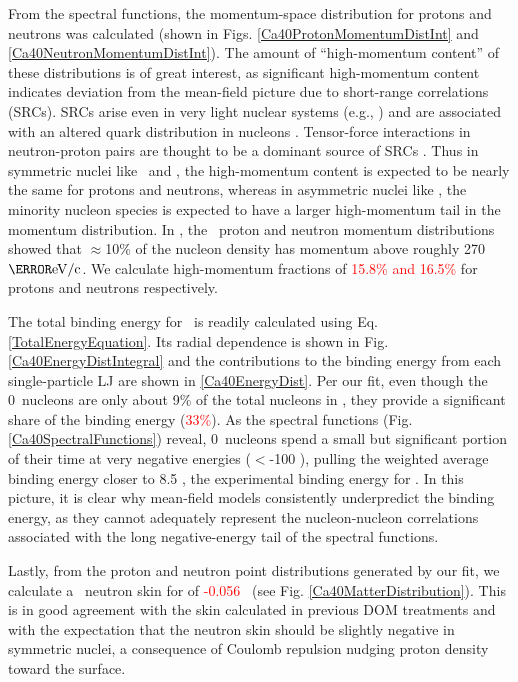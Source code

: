 From the spectral functions, the momentum-space distribution for protons and neutrons was
calculated (shown in Figs. \ref{Ca40ProtonMomentumDistInt} and
\ref{Ca40NeutronMomentumDistInt}). 
The amount of ``high-momentum content'' of
these distributions is of great interest, as significant high-momentum content 
indicates deviation from the mean-field picture due to short-range correlations (SRCs). SRCs arise 
even in very light nuclear systems (e.g., \heFour)
and are associated with an altered quark distribution in nucleons 
\cite{Hen2012, Arrington2012, CLAS2019}.
Tensor-force interactions in neutron-proton pairs are thought to be a dominant source of 
SRCs \cite{Subedi2008}. Thus in symmetric nuclei like \cTwelve\ and \caForty, the
high-momentum content is expected to be nearly the same for protons and neutrons, whereas in
asymmetric nuclei like \pbEight, the minority nucleon species is expected to have a larger
high-momentum tail in the momentum distribution. In \cite{Rohe2004}, the \cTwelve\ proton and
neutron momentum distributions showed that $\approx$10\% of the nucleon density
has momentum above roughly 270 $\mega\electronvolt/\text{c}$.
We calculate high-momentum fractions of \textcolor{red}{15.8\% and 16.5\%}
for protons and neutrons respectively.

The total binding energy for \caForty\ is readily calculated using Eq.
\ref{TotalEnergyEquation}. Its radial dependence is shown in Fig.
\ref{Ca40EnergyDistIntegral} and the
contributions to the binding energy from each single-particle LJ are shown in
\ref{Ca40EnergyDist}. Per our fit, even though the 0\sOne\ nucleons are
only about 9\% of the total nucleons in \caForty, they provide a significant
share of the binding
energy (\textcolor{red}{33\%}). As the spectral
functions (Fig. \ref{Ca40SpectralFunctions}) reveal, 0\sOne\ nucleons spend a small but significant portion of their time 
at very negative energies ($<$-100 \mega\electronvolt), pulling the weighted average binding energy 
closer to 8.5 \mega\electronvolt{}, the experimental binding energy for \caForty. In this
picture, it is clear why mean-field models consistently underpredict the binding energy, as they
cannot adequately represent the nucleon-nucleon correlations associated with the long
negative-energy tail of the spectral functions.

Lastly, from the proton and neutron point distributions generated by our fit, we calculate a
\caForty\ neutron skin for of \textcolor{red}{-0.056} \femto\meter\ (see Fig. \ref{Ca40MatterDistribution}). 
This is in good agreement with the skin calculated in previous DOM treatments
\cite{MahzoonPhDThesis} and with the expectation that the neutron skin should be slightly negative in
symmetric nuclei, a consequence of Coulomb repulsion nudging proton density toward the surface.

